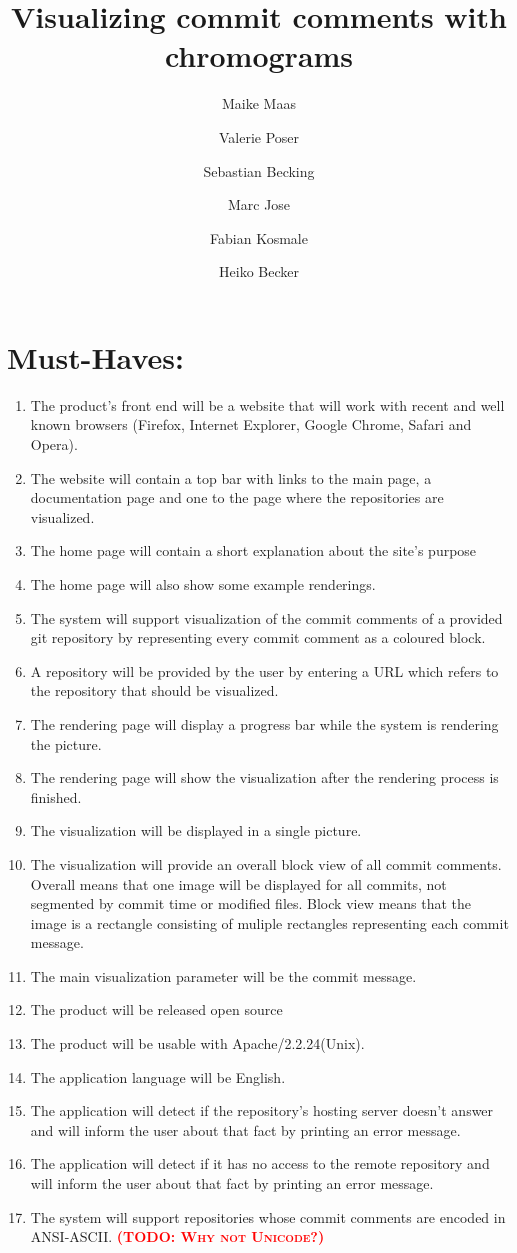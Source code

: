 \documentclass[12pt]{scrartcl}
\author{Maike Maas \and Valerie Poser \and Sebastian Becking
\and Marc Jose \and Fabian Kosmale  \and Heiko Becker}
\title{Visualizing commit comments with chromograms}
\newcommand{\todo}[1]{\textbf{\textsc{\textcolor{red}{(TODO: #1)}}}}
\begin{document}
\maketitle
\section{Must-Haves:}
\begin{enumerate}
\item The product's front end will be a website that will work with recent and well known browsers (Firefox, Internet Explorer, Google Chrome, Safari and Opera). 
\item The website will contain a top bar with links to the main page, a documentation page and one to the page where the repositories are visualized. 
\item The home page will contain a short explanation about the site's purpose
\item The home page will also show some example renderings.
\item The system will support visualization of the commit comments of a provided git repository by representing every commit comment as a coloured block.
\item A repository will be provided by the user by entering a URL which refers to the repository that should be visualized.
\item The rendering page will display a progress bar while the system is rendering the picture.
\item The rendering page will show the visualization after the rendering process is finished.
\item The visualization will be displayed in a single picture.
\item The visualization will provide an overall block view of all commit
	comments. Overall means that one image will be displayed for all
	commits, not segmented by commit time or modified files. Block view means
	that the image is a rectangle consisting of muliple rectangles
	representing each commit message.
\item The main visualization parameter will be the commit message.
\item The product will be released open source 
\item The product will be usable with Apache/2.2.24(Unix).
\item The application language will be English.
\item The application will detect if the repository's hosting server doesn't answer and will inform the user about that fact by printing an error message.
\item The application will detect if it has no access to the remote repository and will inform the user about that fact by printing an error message.
\item The system will support repositories whose commit comments are encoded in ANSI-ASCII. \todo{Why not Unicode?}
\end{enumerate}
\end{document}
